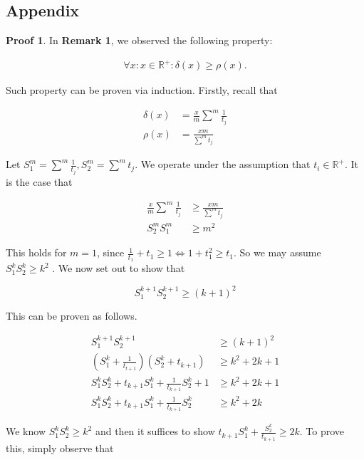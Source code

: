 \documentclass{article}
\begin{document}
\begin{multicols}{2}

\section{Appendix}

\textbf{Proof 1}. In \textbf{Remark 1}, we observed the following property:

    \begin{align*}
        \forall x: x \in \mathbb{R}^+ : \delta(x) \geq \rho(x)
    .\end{align*}

Such property can be proven via induction. Firstly, recall that


\begin{align*} \delta(x) &= \frac{x}{m}\sum^m\frac{1}{t_j} \\
                \rho(x) &= \frac{xm}{\sum^m t_j} \end{align*}


Let $S_1^m = \sum^m\frac{1}{t_j}, S_2^m= \sum^m t_j$. We operate under the
assumption that $t_i \in \mathbb{R}^+$. It is the case that

\begin{align*} 
    \frac{x}{m}\sum^m\frac{1}{t_j} &\geq \frac{xm}{\sum^m t_j} \\ 
    S_2^mS_1^m &\geq m^2
\end{align*}

This holds for $m=1$, since $\frac{1}{t_1}+t_1 \geq 1 \iff 1+t_1^2 \geq t_1$. So
we may assume $S^k_1 S^k_2 \geq k^2$ . We now set out to show that

\begin{equation*} 
    S^{k+1}_1 S^{k+1}_2 \geq (k+1)^2
\end{equation*}

This can be proven as follows.

\begin{align*} 
    S^{k+1}_1 S^{k+1}_2 &\geq (k+1)^2 \\ 
    (S_1^k+\frac{1}{t_{t+1}})(S_2^k+t_{k+1}) &\geq k^2+2k+1 \\
    S^k_1S^k_2+ t_{k+1}S_1^k + \frac{1}{t_{k+1}}S^k_2+1 &\geq k^2+2k+1 \\
    S^k_1S^k_2+ t_{k+1}S_1^k + \frac{1}{t_{k+1}}S^k_2 &\geq k^2+2k 
\end{align*}

We know $S^k_1S^k_2 \geq k^2$ and then it suffices to show $t_{k+1}S_1^k +
\frac{S^k_2}{t_{k+1}}\geq 2k$. To prove this, simply observe that


\end{multicols}
\end{document}
